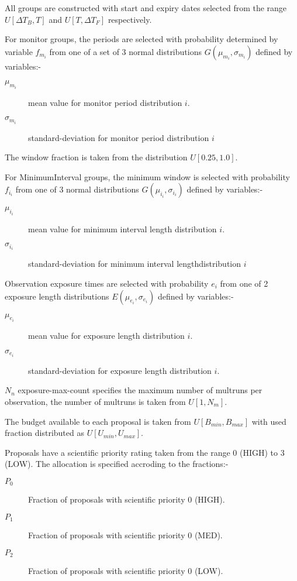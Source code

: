 All groups are constructed with start and expiry dates selected from the range $U[\Delta{T_B}, T]$ and $U[T, \Delta{T_F}]$ respectively. 

For monitor groups, the periods are selected with probability determined by variable $f_{m_i}$ from one of a set of 3 normal distributions $G(\mu_{m_i}, \sigma_{m_i})$ defined by variables:-

\begin{description}
\item [$\mu_{m_i}$]     mean value for monitor period distribution $i$.
\item [$\sigma_{m_i}$]  standard-deviation for monitor period distribution $i$
\end{description}
The window fraction is taken from the distribution $U[0.25, 1.0]$.


For MinimumInterval groups, the minimum window is selected with probability $f_{i_i}$ from one of 3 normal distributions $G(\mu_{i_i}, \sigma_{i_i})$ defined by variables:-

\begin{description}
\item [$\mu_{i_i}$]     mean value for minimum interval length distribution $i$.
\item [$\sigma_{i_i}$]  standard-deviation for minimum interval lengthdistribution $i$
\end{description}


Observation exposure times are selected with probability $e_i$ from one of 2 exposure length distributions $E(\mu_{e_i}, \sigma_{e_i})$ defined by variables:-
\begin{description}
\item [$\mu_{e_i}$]    mean value for exposure length distribution $i$.
\item [$\sigma_{e_i}$] standard-deviation for exposure length distribution $i$.
\end{description}
$N_n$ exposure-max-count specifies the maximum number of multruns per observation, the number of multruns is taken from $U[1,N_m]$. 


The budget available to each proposal is taken from $U[B_{min}, B_{max}]$ with used fraction distributed as $U[U_{min}, U_{max}]$.

Proposals have a scientific priority rating taken from the range 0 (HIGH) to 3 (LOW). The allocation is specified accroding to the fractions:-
\begin{description}
\item [$P_0$] Fraction of proposals with scientific priority 0 (HIGH).
\item [$P_1$] Fraction of proposals with scientific priority 0 (MED).
\item [$P_2$] Fraction of proposals with scientific priority 0 (LOW).
\end{description}

